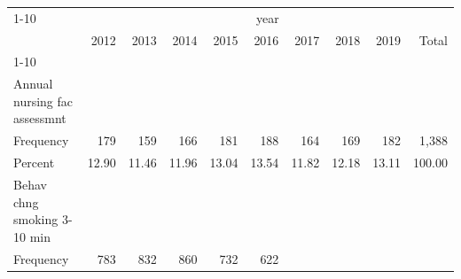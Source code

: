 \documentclass{article}
\begin{document}
\begin{table}[!h]
\centering
\begin{tabular}{llllllllll}
\cline{1-10}
\multicolumn{1}{c}{} &
  \multicolumn{9}{|c}{year} \\
\multicolumn{1}{c}{} &
  \multicolumn{1}{|r}{2012} &
  \multicolumn{1}{r}{2013} &
  \multicolumn{1}{r}{2014} &
  \multicolumn{1}{r}{2015} &
  \multicolumn{1}{r}{2016} &
  \multicolumn{1}{r}{2017} &
  \multicolumn{1}{r}{2018} &
  \multicolumn{1}{r}{2019} &
  \multicolumn{1}{r}{Total} \\
\cline{1-10}
\multicolumn{1}{l}{hcpcsgroup} &
  \multicolumn{1}{|r}{} &
  \multicolumn{1}{r}{} &
  \multicolumn{1}{r}{} &
  \multicolumn{1}{r}{} &
  \multicolumn{1}{r}{} &
  \multicolumn{1}{r}{} &
  \multicolumn{1}{r}{} &
  \multicolumn{1}{r}{} &
  \multicolumn{1}{r}{} \\
\multicolumn{1}{l}{\hspace{1em}Annual nursing fac assessmnt} &
  \multicolumn{1}{|r}{} &
  \multicolumn{1}{r}{} &
  \multicolumn{1}{r}{} &
  \multicolumn{1}{r}{} &
  \multicolumn{1}{r}{} &
  \multicolumn{1}{r}{} &
  \multicolumn{1}{r}{} &
  \multicolumn{1}{r}{} &
  \multicolumn{1}{r}{} \\
\multicolumn{1}{l}{\hspace{2em}Frequency} &
  \multicolumn{1}{|r}{179} &
  \multicolumn{1}{r}{159} &
  \multicolumn{1}{r}{166} &
  \multicolumn{1}{r}{181} &
  \multicolumn{1}{r}{188} &
  \multicolumn{1}{r}{164} &
  \multicolumn{1}{r}{169} &
  \multicolumn{1}{r}{182} &
  \multicolumn{1}{r}{1,388} \\
\multicolumn{1}{l}{\hspace{2em}Percent} &
  \multicolumn{1}{|r}{12.90} &
  \multicolumn{1}{r}{11.46} &
  \multicolumn{1}{r}{11.96} &
  \multicolumn{1}{r}{13.04} &
  \multicolumn{1}{r}{13.54} &
  \multicolumn{1}{r}{11.82} &
  \multicolumn{1}{r}{12.18} &
  \multicolumn{1}{r}{13.11} &
  \multicolumn{1}{r}{100.00} \\
\multicolumn{1}{l}{\hspace{1em}Behav chng smoking 3-10 min} &
  \multicolumn{1}{|r}{} &
  \multicolumn{1}{r}{} &
  \multicolumn{1}{r}{} &
  \multicolumn{1}{r}{} &
  \multicolumn{1}{r}{} &
  \multicolumn{1}{r}{} &
  \multicolumn{1}{r}{} &
  \multicolumn{1}{r}{} &
  \multicolumn{1}{r}{} \\
\multicolumn{1}{l}{\hspace{2em}Frequency} &
  \multicolumn{1}{|r}{783} &
  \multicolumn{1}{r}{832} &
  \multicolumn{1}{r}{860} &
  \multicolumn{1}{r}{732} &
  \multicolumn{1}{r}{622} &

\end{tabular}
\end{table}
\end{document}
